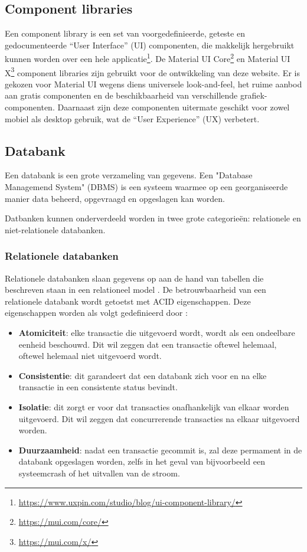 \subsection{Component libraries}
Een component library is een set van voorgedefinieerde, geteste en gedocumenteerde ``User Interface'' (UI) componenten, die makkelijk hergebruikt kunnen worden over een hele applicatie\footnote{\href{https://www.uxpin.com/studio/blog/ui-component-library/}{https://www.uxpin.com/studio/blog/ui-component-library/}}.
De Material UI Core\footnote{\href{https://mui.com/core/}{https://mui.com/core/}} en Material UI X\footnote{\href{https://mui.com/x/}{https://mui.com/x/}} component libraries zijn gebruikt voor de ontwikkeling van deze website. Er is gekozen voor Material UI wegens diens universele look-and-feel, het ruime aanbod aan gratis componenten en de beschikbaarheid van verschillende grafiek-componenten. Daarnaast zijn deze componenten uitermate geschikt voor zowel mobiel als desktop gebruik, wat de ``User Experience'' (UX) verbetert.

\subsection{Databank}

Een databank is een grote verzameling van gegevens. Een "Database Managemend System" (DBMS) is een systeem waarmee op een georganiseerde manier data beheerd, opgevraagd en opgeslagen kan worden.

Datbanken kunnen onderverdeeld worden in twee grote categorieën: relationele en niet-relationele databanken.

\subsubsection{Relationele databanken}

Relationele databanken slaan gegevens op aan de hand van tabellen die beschreven staan in een relationeel model \autocite{Elsabagh2022}.
De betrouwbaarheid van een  relationele databank wordt getoetst met ACID eigenschappen. Deze eigenschappen worden als volgt gedefinieerd door \textcite{Elsabagh2022}:

\begin{itemize}
    \item \textbf{Atomiciteit}: elke transactie die uitgevoerd wordt, wordt als een ondeelbare eenheid beschouwd. Dit wil zeggen dat een transactie oftewel helemaal, oftewel helemaal niet uitgevoerd wordt.
    \item \textbf{Consistentie}: dit garandeert dat een databank zich voor en na elke transactie in een consistente status bevindt.
    \item \textbf{Isolatie}: dit zorgt er voor dat transacties onafhankelijk van elkaar worden uitgevoerd. Dit wil zeggen dat concurrerende transacties na elkaar uitgevoerd worden.
    \item \textbf{Duurzaamheid}: nadat een transactie gecommit is, zal deze permament in de databank opgeslagen worden, zelfs in het geval van bijvoorbeeld een systeemcrash of het uitvallen van de stroom.
\end{itemize}

